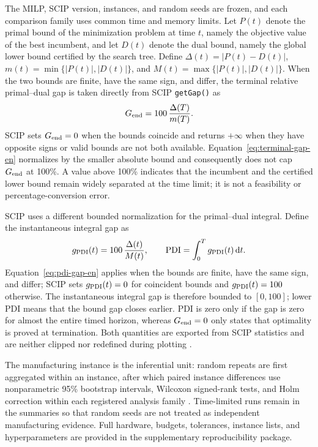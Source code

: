 \documentclass[final,5p,times,twocolumn]{elsarticle}
\newcommand{\pdi}{\mathrm{PDI}}
\begin{document}
The MILP, SCIP version, instances, and random seeds are frozen, and each comparison family uses common time and memory limits. Let $P(t)$ denote the primal bound of the minimization problem at time $t$, namely the objective value of the best incumbent, and let $D(t)$ denote the dual bound, namely the global lower bound certified by the search tree. Define $\Delta(t)=|P(t)-D(t)|$, $m(t)=\min\{|P(t)|,|D(t)|\}$, and $M(t)=\max\{|P(t)|,|D(t)|\}$. When the two bounds are finite, have the same sign, and differ, the terminal relative primal--dual gap is taken directly from SCIP \texttt{getGap()} as
\begin{equation}
G_{\rm end}=100\,\frac{\Delta(T)}{m(T)}.
\label{eq:terminal-gap-en}
\end{equation}
SCIP sets $G_{\rm end}=0$ when the bounds coincide and returns $+\infty$ when they have opposite signs or valid bounds are not both available. Equation~\eqref{eq:terminal-gap-en} normalizes by the smaller absolute bound and consequently does not cap $G_{\rm end}$ at 100\%. A value above 100\% indicates that the incumbent and the certified lower bound remain widely separated at the time limit; it is not a feasibility or percentage-conversion error.

SCIP uses a different bounded normalization for the primal--dual integral. Define the instantaneous integral gap as
\begin{equation}
g_{\rm PDI}(t)=100\,\frac{\Delta(t)}{M(t)},\qquad
\pdi=\int_0^T g_{\rm PDI}(t)\,\mathrm dt.
\label{eq:pdi-gap-en}
\end{equation}
Equation~\eqref{eq:pdi-gap-en} applies when the bounds are finite, have the same sign, and differ; SCIP sets $g_{\rm PDI}(t)=0$ for coincident bounds and $g_{\rm PDI}(t)=100$ otherwise. The instantaneous integral gap is therefore bounded to $[0,100]$; lower PDI means that the bound gap closes earlier. PDI is zero only if the gap is zero for almost the entire timed horizon, whereas $G_{\rm end}=0$ only states that optimality is proved at termination. Both quantities are exported from SCIP statistics and are neither clipped nor redefined during plotting \citep{achterberg2009scip,bestuzheva2023scip}.

The manufacturing instance is the inferential unit: random repeats are first aggregated within an instance, after which paired instance differences use nonparametric 95\% bootstrap intervals, Wilcoxon signed-rank tests, and Holm correction within each registered analysis family \citep{gleixner2021miplib}. Time-limited runs remain in the summaries so that random seeds are not treated as independent manufacturing evidence. Full hardware, budgets, tolerances, instance lists, and hyperparameters are provided in the supplementary reproducibility package.
\end{document}
